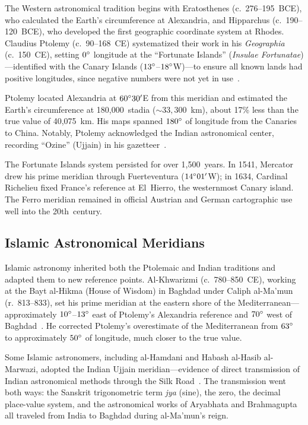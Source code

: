\documentclass[10pt,a4paper]{article}
\begin{document}
The Western astronomical tradition begins with Eratosthenes (c.~276--195~BCE),
who calculated the Earth's circumference at Alexandria, and Hipparchus
(c.~190--120~BCE), who developed the first geographic coordinate system at
Rhodes. Claudius Ptolemy (c.~90--168~CE) systematized their work in his
\textit{Geographia} (c.~150~CE), setting $0\degree$ longitude at the
``Fortunate Islands'' (\textit{Insulae Fortunatae})---identified with the
Canary Islands ($13\degree$--$18\degree$W)---to ensure all known lands had
positive longitudes, since negative numbers were not yet in
use~\cite{berggren2000}.

Ptolemy located Alexandria at $60\degree 30'$E from this meridian and
estimated the Earth's circumference at 180,000~stadia (${\sim}33{,}300$~km),
about 17\% less than the true value of 40,075~km. His maps spanned
$180\degree$ of longitude from the Canaries to China. Notably, Ptolemy
acknowledged the Indian astronomical center, recording ``Ozine'' (Ujjain) in
his gazetteer~\cite{berggren2000}.

The Fortunate Islands system persisted for over 1,500~years. In 1541,
Mercator drew his prime meridian through Fuerteventura ($14\degree 01'$W);
in 1634, Cardinal Richelieu fixed France's reference at El~Hierro, the
westernmost Canary island. The Ferro meridian remained in official Austrian
and German cartographic use well into the 20th~century.

\subsection{Islamic Astronomical Meridians}
\label{subsec:islamic}

Islamic astronomy inherited both the Ptolemaic and Indian traditions and
adapted them to new reference points. Al-Khwarizmi (c.~780--850~CE),
working at the Bayt al-Hikma (House of Wisdom) in Baghdad under Caliph
al-Ma'mun (r.~813--833), set his prime meridian at the eastern shore of
the Mediterranean---approximately $10\degree$--$13\degree$ east of
Ptolemy's Alexandria reference and $70\degree$ west of
Baghdad~\cite{kennedy1956}. He corrected Ptolemy's overestimate of the
Mediterranean from $63\degree$ to approximately $50\degree$ of longitude,
much closer to the true value.

Some Islamic astronomers, including al-Hamdani and Habash al-Hasib
al-Marwazi, adopted the Indian Ujjain meridian---evidence of direct
transmission of Indian astronomical methods through the Silk
Road~\cite{pingree1970}. The transmission went both ways: the Sanskrit
trigonometric term \textit{jya} (sine), the zero, the decimal place-value
system, and the astronomical works of Aryabhata and Brahmagupta all traveled
from India to Baghdad during al-Ma'mun's reign.
\end{document}
